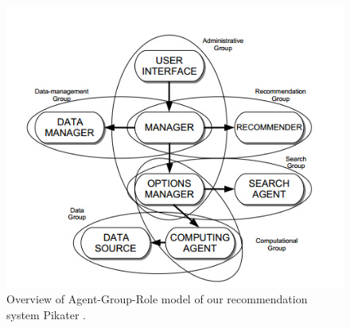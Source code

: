 \begin{figure}
	\includegraphics[width=14cm]{Images/pikaterArchitecture.png}
	\centering
	\caption{Overview of Agent-Group-Role model of our recommendation system Pikater \cite{jaPikater}.}
	\label{fig:pikaterArchitecture}	
\end{figure}

